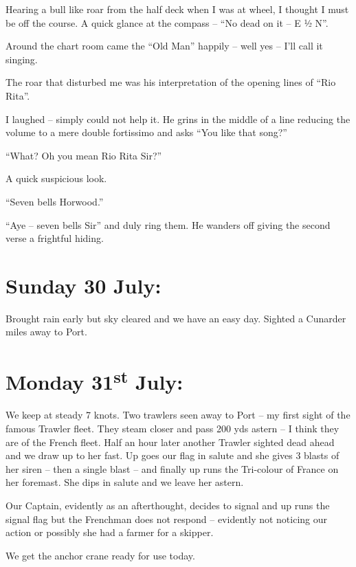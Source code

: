 \documentclass[
  11pt,
  msmallroyalvopaper
]{memoir}
\begin{document}
Hearing a bull like roar from the half deck when I was at wheel, I
thought I must be off the course. A quick glance at the compass -- ``No
dead on it -- E ½ N''.

Around the chart room came the ``Old Man'' happily -- well yes -- I'll
call it singing.

The roar that disturbed me was his interpretation of the opening lines
of ``Rio Rita''.

I laughed -- simply could not help it. He grins in the middle of a line
reducing the volume to a mere double fortissimo and asks ``You like that
song?''

``What? Oh you mean Rio Rita Sir?''

A quick suspicious look.

``Seven bells Horwood.''

``Aye -- seven bells Sir'' and duly ring them. He wanders off giving the
second verse a frightful hiding.

\hypertarget{sunday-30-july}{%
\section{Sunday 30 July:}\label{sunday-30-july}}

Brought rain early but sky cleared and we have an easy day. Sighted a
Cunarder miles away to Port.

\hypertarget{monday-31st-july}{%
\section{\texorpdfstring{Monday 31\textsuperscript{st}
July:}{Monday 31st July:}}\label{monday-31st-july}}

We keep at steady 7 knots. Two trawlers seen away to Port -- my first
sight of the famous Trawler fleet. They steam closer and pass 200 yds
astern -- I think they are of the French fleet. Half an hour later
another Trawler sighted dead ahead and we draw up to her fast. Up goes
our flag in salute and she gives 3 blasts of her siren -- then a single
blast -- and finally up runs the Tri-colour of France on her foremast.
She dips in salute and we leave her astern.

Our Captain, evidently as an afterthought, decides to signal and up runs
the signal flag but the Frenchman does not respond -- evidently not
noticing our action or possibly she had a farmer for a skipper.

We get the anchor crane ready for use today.
\end{document}
